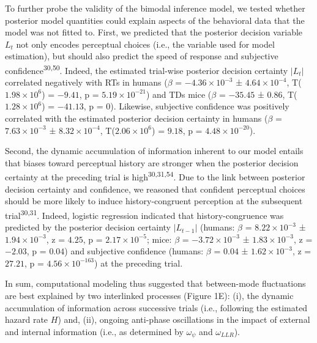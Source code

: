 \documentclass[
]{article}
\begin{document}
To further probe the validity of the bimodal inference model, we tested
whether posterior model quantities could explain aspects of the
behavioral data that the model was not fitted to. First, we predicted
that the posterior decision variable \(L_t\) not only encodes perceptual
choices (i.e., the variable used for model estimation), but should also
predict the speed of response and subjective
confidence\textsuperscript{30,50}. Indeed, the estimated trial-wise
posterior decision certainty \(|L_t|\) correlated negatively with RTs in
humans (\(\beta\) = \(\ensuremath{-4.36\times 10^{-3}}\) ±
\(\ensuremath{4.64\times 10^{-4}}\),
T(\(\ensuremath{1.98\times 10^{6}}\)) = \(-9.41\), p =
\(\ensuremath{5.19\times 10^{-21}}\)) and TDs mice (\(\beta\) =
\(-35.45\) ± \(0.86\), T(\(\ensuremath{1.28\times 10^{6}}\)) =
\(-41.13\), p = \(0\)). Likewise, subjective confidence was positively
correlated with the estimated posterior decision certainty in humans
(\(\beta\) = \(\ensuremath{7.63\times 10^{-3}}\) ±
\(\ensuremath{8.32\times 10^{-4}}\),
T(\(\ensuremath{2.06\times 10^{6}}\)) = \(9.18\), p =
\(\ensuremath{4.48\times 10^{-20}}\)).

Second, the dynamic accumulation of information inherent to our model
entails that biases toward perceptual history are stronger when the
posterior decision certainty at the preceding trial is
high\textsuperscript{30,31,54}. Due to the link between posterior
decision certainty and confidence, we reasoned that confident perceptual
choices should be more likely to induce history-congruent perception at
the subsequent trial\textsuperscript{30,31}. Indeed, logistic regression
indicated that history-congruence was predicted by the posterior
decision certainty \(|L_{t-1}|\) (humans: \(\beta\) =
\(\ensuremath{8.22\times 10^{-3}}\) ±
\(\ensuremath{1.94\times 10^{-3}}\), z = \(4.25\), p =
\(\ensuremath{2.17\times 10^{-5}}\); mice: \(\beta\) =
\(\ensuremath{-3.72\times 10^{-3}}\) ±
\(\ensuremath{1.83\times 10^{-3}}\), z = \(-2.03\), p = \(0.04\)) and
subjective confidence (humans: \(\beta\) = \(0.04\) ±
\(\ensuremath{1.62\times 10^{-3}}\), z = \(27.21\), p =
\(\ensuremath{4.56\times 10^{-163}}\)) at the preceding trial.

In sum, computational modeling thus suggested that between-mode
fluctuations are best explained by two interlinked processes (Figure
1E): (i), the dynamic accumulation of information across successive
trials (i.e., following the estimated hazard rate \(H\)) and, (ii),
ongoing anti-phase oscillations in the impact of external and internal
information (i.e., as determined by \(\omega_{\psi}\) and
\(\omega_{LLR}\)).
\end{document}
